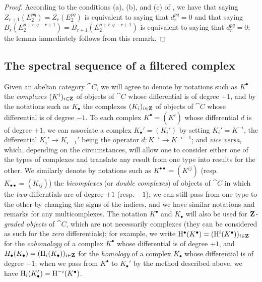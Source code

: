 \begin{proof}
According to the conditions (a), (b), and (c) of , we have that saying $Z_{r+1}(E_2^{pq})=Z_r(E_2^{pq})$ is equivalent to saying that $d_r^{pq}=0$ and that saying $B_r(E_2^{p+r,q-r+1})=B_{r+1}(E_2^{p+r,q-r+1})$ is equivalent to saying that $d_r^{pq}=0$; the lemma immediately follows from this remark.
\end{proof}

\subsection{The spectral sequence of a filtered complex}
\label{subsection:0.11.2}

\begin{env}[11.2.1]
\label{0.11.2.1}
Given an abelian category $\cat{C}$, we will agree to denote by notations such as $K^\bullet$ the \emph{complexes $(K^i)_{i\in\mathbf{Z}}$} of objects of $\cat{C}$ whose differential is of degree $+1$, and by the notations such as $K_\bullet$ the complexes $(K_i)_{i\in\mathbf{Z}}$ of objects of $\cat{C}$ whose differential is of degree $-1$.
To each complex $K^\bullet=(K^i)$ whose differential $d$ is of degree $+1$, we can associate a complex $K_\bullet'=(K_i')$ by setting $K_i'=K^{-i}$, the differential $K_i'\to K_{i-1}'$ being the operator $d:K^{-i}\to K^{-i-1}$; and \emph{vice versa}, which, depending on the circumstances, will allow one to consider either one of the types of complexes and translate  any result from one type into results for the other.
We similarly denote by notations such as $K^{\bullet\bullet}=(K^{ij})$ (resp. $K_{\bullet\bullet}=(K_{ij})$) the \emph{bicomplexes} (or \emph{double complexes}) of objects of $\cat{C}$ in which the \emph{two} differntials are of degree $+1$ (resp. $-1$); we can still pass from one type to the other by changing the signs of the indices, and we have similar notations and remarks for any multicomplexes.
The notation $K^\bullet$ and $K_\bullet$ will also be used for \emph{$\mathbf{Z}$-graded objects} of $\cat{C}$, which are not necessarily complexes (they can be considered as such for the \emph{zero} differentials); for example, we write $\mathrm{H}^\bullet(K^\bullet)=(\mathrm{H}^i(K^\bullet))_{i\in\mathbf{Z}}$ for the \emph{cohomology} of a complex $K^\bullet$ whose differential is of degree $+1$, and $H_\bullet(K_\bullet)=(\mathrm{H}_i(K_\bullet))_{i\in\mathbf{Z}}$ for the \emph{homology} of a complex $K_\bullet$ whose differential is of degree $-1$; when we pass from $K^\bullet$ to $K_\bullet'$ by the method described above, we have $\mathrm{H}_i(K_\bullet')=\mathrm{H}^{-i}(K^\bullet)$.


\end{env}
